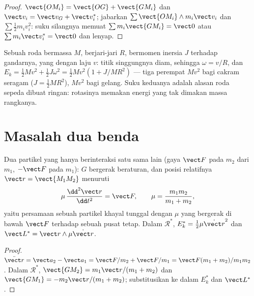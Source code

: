 \begin{proof}
$\vect{OM_i} = \vect{OG} + \vect{GM_i}$ dan $\vect v_i = \vect v_G + \vect v_i^*$;
jabarkan $\sum\vect{OM_i}\wedge m_i\vect v_i$ dan $\sum\tfrac12 m_iv_i^2$: suku
silangnya memuat $\sum m_i\vect{GM_i} = \vect 0$ atau $\sum m_i\vect v_i^* = \vect 0$
dan lenyap.
\end{proof}

\begin{example}\label{ex:b1:systems-of-points:rolling}
Sebuah roda bermassa $M$, berjari-jari $R$, bermomen inersia $J$ terhadap gandarnya,
yang  dengan laju $v$: titik singgungnya diam, sehingga
$\omega = v/R$, dan $E_k = \tfrac12 Mv^2 + \tfrac12 J\omega^2 = \tfrac12 Mv^2(1 +
J/MR^2)$ --- tiga perempat $Mv^2$ bagi cakram seragam ($J = \tfrac12 MR^2$),
$Mv^2$ bagi gelang. Suku keduanya adalah alasan roda sepeda dibuat
ringan: rotasinya memakan energi yang tak dimakan massa rangkanya.
\end{example}

\section{Masalah dua benda}

\begin{proposition}\label{prop:b1:systems-of-points:twobody}
Dua partikel yang hanya berinteraksi satu sama lain (gaya $\vect F$ pada $m_2$
dari $m_1$, $-\vect F$ pada $m_1$): $G$ bergerak beraturan, dan posisi
relatifnya $\vect r = \vect{M_1M_2}$ menuruti
\[
\mu\,\frac{\dd^2\vect r}{\dd t^2} = \vect F, \qquad \mu = \frac{m_1m_2}{m_1 + m_2},
\]
yaitu persamaan sebuah partikel khayal tunggal dengan \emph{} $\mu$
yang bergerak di bawah $\vect F$ terhadap sebuah pusat tetap. Dalam $\mathcal R^*$, $E_k^* =
\tfrac12\mu\dot{\vect r}^2$ dan $\vect L^* = \vect r\wedge\mu\dot{\vect r}$.
\end{proposition}

\begin{proof}
$\ddot{\vect r} = \vect a_2 - \vect a_1 = \vect F/m_2 + \vect F/m_1 = \vect F(m_1 +
m_2)/m_1m_2$. Dalam $\mathcal R^*$, $\vect{GM_2} = m_1\vect r/(m_1 + m_2)$ dan
$\vect{GM_1} = -m_2\vect r/(m_1 + m_2)$; substitusikan ke dalam $E_k^*$ dan $\vect L^*$.
\end{proof}

